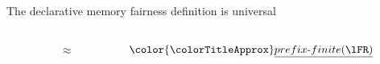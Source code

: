 \begin{frame}{The declarative memory fairness definition is universal}
  \pause

  \begin{columns}
    
    \begin{column}{0.45\linewidth}
      \begin{center}
        \propSubtrace
      \end{center}    
    \end{column}

    \begin{column}{0.05\linewidth}
      {\LARGE $\approx$}
    \end{column}
    
    \begin{column}{0.40\linewidth}
      \begin{center}
        ${\color{\colorTitleApprox}\underline{prefix\text{-}finite(\lFR)}}$
      \end{center}
    \end{column}      

  \end{columns}

  \vspace{0.5cm}

  \begin{center}
{\large     
  }
\end{center}


\end{frame}


